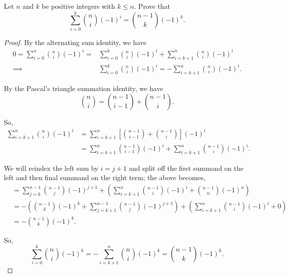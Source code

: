 \documentclass{article}
\begin{document}
Let $n$ and $k$ be positive integers with $k \le n$. Prove that
\[
	\sum_{i=0}^k \binom{n}{i}(-1)^i = \binom{n-1}{k}(-1)^k.
\]
\begin{proof}
	By the alternating sum identity, we have
	\begin{align*}
		0=\sum_{i=0}^{n} \binom{n}{i} (-1)^i = & \sum_{i=0}^{k} \binom{n}{i} (-1)^i+\sum_{i=k+1}^{n} \binom{n}{i} (-1)^i     \\
		\implies                               & \sum_{i=0}^{k} \binom{n}{i} (-1)^i = - \sum_{i=k+1}^{n} \binom{n}{i} (-1)^i
		.\end{align*}

	By the Pascal's triangle summation identity, we have
	\[
		\binom{n}{i}= \binom{n-1}{i-1}+\binom{n-1}{i}
		.\]

	So,
	\begin{align*}
		\sum_{i=k+1}^{n} \binom{n}{i} (-1)^i & = \sum_{i=k+1}^{n} \left[ \binom{n-1}{i-1}+\binom{n-1}{i} \right](-1)^i             \\
		                                     & = \sum_{i=k+1}^{n} \binom{n-1}{i-1} (-1)^i + \sum_{i=k+1}^{n} \binom{n-1}{i} (-1)^i
		.\end{align*}

	We will reindex the left sum by $i=j + 1$ and split off the first summand on the left and then final summand on the right term; the above becomes,
	\begin{align*}
		 & = \sum_{j=k}^{n-1} \binom{n-1}{j} (-1)^{j+1}+\left( \sum_{i=k+1}^{n} \binom{n-1}{i} (-1)^i + \binom{n-1}{n}(-1)^n \right)                        \\
		 & = -\left( \binom{n-1}{k}(-1)^k + \sum_{j=k+1}^{n-1} \binom{n-1}{j} (-1)^{j+1}\right) + \left( \sum_{i=k+1}^{n} \binom{n-1}{i} (-1)^i + 0 \right) \\
		 & = -\binom{n-1}{k}(-1)^k
		.\end{align*}

	So, \[
		\sum_{i=0}^{k} \binom{n}{i} (-1)^k = -\sum_{i=k+1}^{n} \binom{n}{i} (-1)^k = \binom{n-1}{k}(-1)^k
		.\]
\end{proof}
\end{document}
